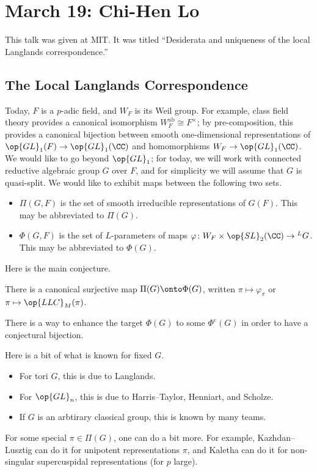 \documentclass{article}
\begin{document}
\section{March 19: Chi-Hen Lo}
This talk was given at MIT. It was titled ``Desiderata and uniqueness of the local Langlands correspondence.''

\subsection{The Local Langlands Correspondence}
Today, $F$ is a $p$-adic field, and $W_F$ is its Weil group. For example, class field theory provides a canonical isomorphism $W_F^{\mathrm{ab}}\cong F^\times$; by pre-composition, this provides a canonical bijection between smooth one-dimensional representations of $\op{GL}_1(F)\to\op{GL}_1(\CC)$ and homomorphisms $W_F\to\op{GL}_1(\CC)$. We would like to go beyond $\op{GL}_1$; for today, we will work with connected reductive algebraic group $G$ over $F$, and for simplicity we will assume that $G$ is quasi-split. We would like to exhibit maps between the following two sets.
\begin{itemize}
	\item $\Pi(G,F)$ is the set of smooth irreducible representations of $G(F)$. This may be abbreviated to $\Pi(G)$.
	\item $\Phi(G,F)$ is the set of $L$-parameters of maps $\varphi\colon W_F\times\op{SL}_2(\CC)\to{}^LG$. This may be abbreviated to $\Phi(G)$.
\end{itemize}
Here is the main conjecture.
\begin{conj}
	There is a canonical surjective map $\Pi(G)\onto\Phi(G)$, written $\pi\mapsto\varphi_\pi$ or $\pi\mapsto\op{LLC}_M(\pi)$.
\end{conj}
\begin{remark}
	There is a way to enhance the target $\Phi(G)$ to some $\Phi^e(G)$ in order to have a conjectural bijection.
\end{remark}
\begin{remark}
	Here is a bit of what is known for fixed $G$.
	\begin{itemize}
		\item For tori $G$, this is due to Langlands.
		\item For $\op{GL}_n$, this is due to Harris--Taylor, Henniart, and Scholze.
		\item If $G$ is an arbtirary classical group, this is known by many teams.
	\end{itemize}
\end{remark}
\begin{remark} \label{rem:small-llc}
	For some special $\pi\in\Pi(G)$, one can do a bit more. For example, Kazhdan--Lusztig can do it for unipotent representations $\pi$, and Kaletha can do it for non-singular supercuspidal representations (for $p$ large).
\end{remark}
\end{document}
